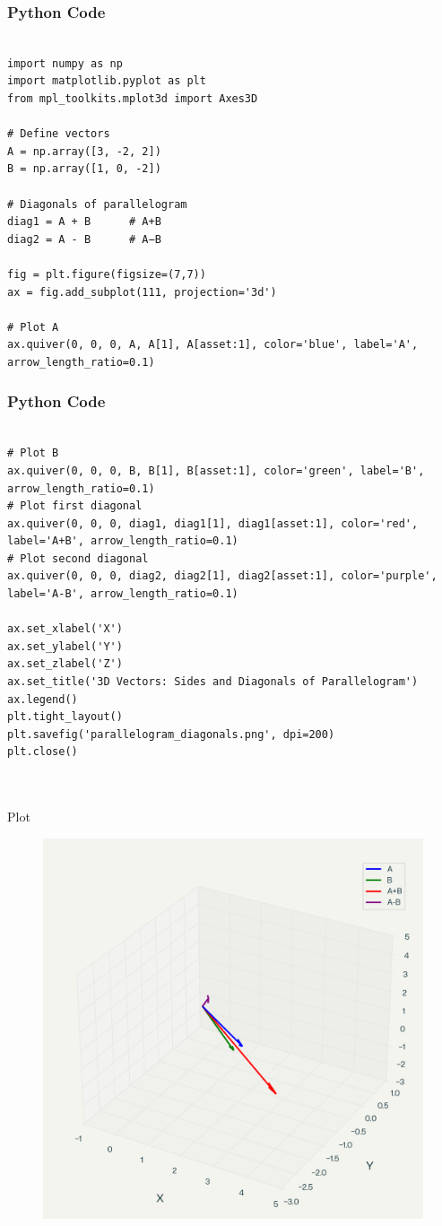 \documentclass{beamer}
\begin{document}
\begin{frame}[fragile]
    \frametitle{Python Code}
    \begin{lstlisting}

import numpy as np
import matplotlib.pyplot as plt
from mpl_toolkits.mplot3d import Axes3D

# Define vectors
A = np.array([3, -2, 2])
B = np.array([1, 0, -2])

# Diagonals of parallelogram
diag1 = A + B      # A+B
diag2 = A - B      # A−B

fig = plt.figure(figsize=(7,7))
ax = fig.add_subplot(111, projection='3d')

# Plot A
ax.quiver(0, 0, 0, A, A[1], A[asset:1], color='blue', label='A', arrow_length_ratio=0.1)

    \end{lstlisting}
\end{frame}


\begin{frame}[fragile]
    \frametitle{Python Code}
    \begin{lstlisting}

# Plot B
ax.quiver(0, 0, 0, B, B[1], B[asset:1], color='green', label='B', arrow_length_ratio=0.1)
# Plot first diagonal
ax.quiver(0, 0, 0, diag1, diag1[1], diag1[asset:1], color='red', label='A+B', arrow_length_ratio=0.1)
# Plot second diagonal
ax.quiver(0, 0, 0, diag2, diag2[1], diag2[asset:1], color='purple', label='A-B', arrow_length_ratio=0.1)

ax.set_xlabel('X')
ax.set_ylabel('Y')
ax.set_zlabel('Z')
ax.set_title('3D Vectors: Sides and Diagonals of Parallelogram')
ax.legend()
plt.tight_layout()
plt.savefig('parallelogram_diagonals.png', dpi=200)
plt.close()



    \end{lstlisting}
\end{frame}




  
\begin{frame}{Plot}
\begin{figure}
    \centering
    \includegraphics[width=0.5\linewidth]{Beamer/figs/parallelogram_diagonals.png}
    \caption{}
    \label{fig:placeholder}
\end{figure}
\end{frame}
\end{document}
